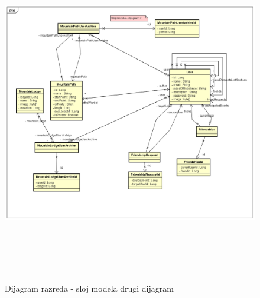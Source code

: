 		\begin{figure}[H]
			\includegraphics[scale=0.6, height=150mm, width=165mm]{dijagrami/model-dijagram2} %
			\centering
			\caption{Dijagram razreda - sloj modela drugi dijagram}
			\label{fig:dijagrami_razreda2}
		\end{figure}
			\newpage
